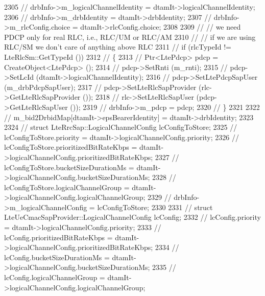\begin{DoxyCode}
2305             \textcolor{comment}{// drbInfo->m\_logicalChannelIdentity = dtamIt->logicalChannelIdentity;}
2306             \textcolor{comment}{// drbInfo->m\_drbIdentity = dtamIt->drbIdentity;}
2307             \textcolor{comment}{// drbInfo->m\_rlcConfig.choice = dtamIt->rlcConfig.choice;}
2308    
2309             \textcolor{comment}{// // we need PDCP only for real RLC, i.e., RLC/UM or RLC/AM}
2310             \textcolor{comment}{// // if we are using RLC/SM we don't care of anything above RLC}
2311             \textcolor{comment}{// if (rlcTypeId != LteRlcSm::GetTypeId ())}
2312             \textcolor{comment}{//   \{}
2313             \textcolor{comment}{//     Ptr<LtePdcp> pdcp = CreateObject<LtePdcp> (); }
2314             \textcolor{comment}{//     pdcp->SetRnti (m\_rnti);}
2315             \textcolor{comment}{//     pdcp->SetLcId (dtamIt->logicalChannelIdentity);}
2316             \textcolor{comment}{//     pdcp->SetLtePdcpSapUser (m\_drbPdcpSapUser);}
2317             \textcolor{comment}{//     pdcp->SetLteRlcSapProvider (rlc->GetLteRlcSapProvider ());}
2318             \textcolor{comment}{//     rlc->SetLteRlcSapUser (pdcp->GetLteRlcSapUser ());}
2319             \textcolor{comment}{//     drbInfo->m\_pdcp = pdcp;}
2320             \textcolor{comment}{//   \}}
2321 
2322             \textcolor{comment}{// m\_bid2DrbidMap[dtamIt->epsBearerIdentity] = dtamIt->drbIdentity;}
2323 
2324             \textcolor{comment}{// struct LteRrcSap::LogicalChannelConfig lcConfigToStore;}
2325             \textcolor{comment}{// lcConfigToStore.priority = dtamIt->logicalChannelConfig.priority;}
2326             \textcolor{comment}{// lcConfigToStore.prioritizedBitRateKbps =
       dtamIt->logicalChannelConfig.prioritizedBitRateKbps;}
2327             \textcolor{comment}{// lcConfigToStore.bucketSizeDurationMs = dtamIt->logicalChannelConfig.bucketSizeDurationMs;}
2328             \textcolor{comment}{// lcConfigToStore.logicalChannelGroup = dtamIt->logicalChannelConfig.logicalChannelGroup;}
2329             \textcolor{comment}{// drbInfo->m\_logicalChannelConfig = lcConfigToStore;    }
2330 
2331             \textcolor{comment}{// struct LteUeCmacSapProvider::LogicalChannelConfig lcConfig;}
2332             \textcolor{comment}{// lcConfig.priority = dtamIt->logicalChannelConfig.priority;}
2333             \textcolor{comment}{// lcConfig.prioritizedBitRateKbps = dtamIt->logicalChannelConfig.prioritizedBitRateKbps;}
2334             \textcolor{comment}{// lcConfig.bucketSizeDurationMs = dtamIt->logicalChannelConfig.bucketSizeDurationMs;}
2335             \textcolor{comment}{// lcConfig.logicalChannelGroup = dtamIt->logicalChannelConfig.logicalChannelGroup;}

\end{DoxyCode}
